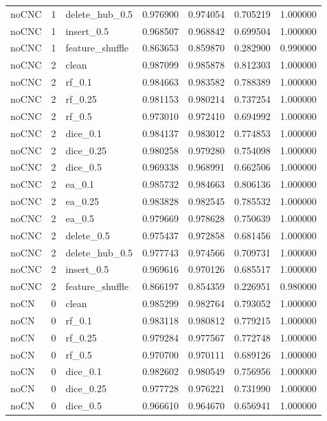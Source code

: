 \documentclass[UTF8,a4paper,11pt,fontset=fandol]{ctexart}
\begin{document}
{\begin{longtable}{lrlrrrr}
noCNC & 1 & delete\_hub\_0.5 & 0.976900 & 0.974054 & 0.705219 & 1.000000 \\
noCNC & 1 & insert\_0.5 & 0.968507 & 0.968842 & 0.699504 & 1.000000 \\
noCNC & 1 & feature\_shuffle & 0.863653 & 0.859870 & 0.282900 & 0.990000 \\
noCNC & 2 & clean & 0.987099 & 0.985878 & 0.812303 & 1.000000 \\
noCNC & 2 & rf\_0.1 & 0.984663 & 0.983582 & 0.788389 & 1.000000 \\
noCNC & 2 & rf\_0.25 & 0.981153 & 0.980214 & 0.737254 & 1.000000 \\
noCNC & 2 & rf\_0.5 & 0.973010 & 0.972410 & 0.694992 & 1.000000 \\
noCNC & 2 & dice\_0.1 & 0.984137 & 0.983012 & 0.774853 & 1.000000 \\
noCNC & 2 & dice\_0.25 & 0.980258 & 0.979280 & 0.754098 & 1.000000 \\
noCNC & 2 & dice\_0.5 & 0.969338 & 0.968991 & 0.662506 & 1.000000 \\
noCNC & 2 & ea\_0.1 & 0.985732 & 0.984663 & 0.806136 & 1.000000 \\
noCNC & 2 & ea\_0.25 & 0.983828 & 0.982545 & 0.785532 & 1.000000 \\
noCNC & 2 & ea\_0.5 & 0.979669 & 0.978628 & 0.750639 & 1.000000 \\
noCNC & 2 & delete\_0.5 & 0.975437 & 0.972858 & 0.681456 & 1.000000 \\
noCNC & 2 & delete\_hub\_0.5 & 0.977743 & 0.974566 & 0.709731 & 1.000000 \\
noCNC & 2 & insert\_0.5 & 0.969616 & 0.970126 & 0.685517 & 1.000000 \\
noCNC & 2 & feature\_shuffle & 0.866197 & 0.854359 & 0.226951 & 0.980000 \\
noCN & 0 & clean & 0.985299 & 0.982764 & 0.793052 & 1.000000 \\
noCN & 0 & rf\_0.1 & 0.983118 & 0.980812 & 0.779215 & 1.000000 \\
noCN & 0 & rf\_0.25 & 0.979284 & 0.977567 & 0.772748 & 1.000000 \\
noCN & 0 & rf\_0.5 & 0.970700 & 0.970111 & 0.689126 & 1.000000 \\
noCN & 0 & dice\_0.1 & 0.982602 & 0.980549 & 0.756956 & 1.000000 \\
noCN & 0 & dice\_0.25 & 0.977728 & 0.976221 & 0.731990 & 1.000000 \\
noCN & 0 & dice\_0.5 & 0.966610 & 0.964670 & 0.656941 & 1.000000 \\

\end{longtable}}
\end{document}
